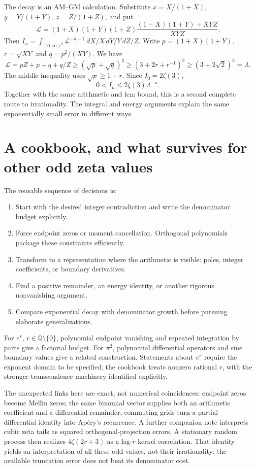 \documentclass[11pt]{article}
\newcommand{\dd}{\,d}
\begin{document}
The decay is an AM--GM calculation. Substitute $x=X/(1+X)$, $y=Y/(1+Y)$, $z=Z/(1+Z)$, and put
\[
 \mathcal L=(1+X)(1+Y)(1+Z)
       \frac{(1+X)(1+Y)+XYZ}{XYZ}.
\]
Then $I_n=\int_{(0,\infty)^3}\mathcal L^{-n-1}\dd X/X\dd Y/Y\dd Z/Z$. Write $p=(1+X)(1+Y)$, $r=\sqrt{XY}$ and $q=p^2/(XY)$. We have
\[
 \mathcal L=pZ+p+q+q/Z\ge(\sqrt p+\sqrt q)^2
 \ge(3+2r+r^{-1})^2\ge(3+2\sqrt2)^2=\Lambda.
\]
The middle inequality uses $\sqrt p\ge1+r$. Since $I_0=2\zeta(3)$,
\[
 0<I_n\le2\zeta(3)\Lambda^{-n}.
\]
Together with the same arithmetic and lcm bound, this is a second complete route to irrationality. The integral and energy arguments explain the same exponentially small error in different ways.

\section{A cookbook, and what survives for other odd zeta values}
The reusable sequence of decisions is:
\begin{enumerate}
 \item Start with the desired integer contradiction and write the denominator budget explicitly.
 \item Force endpoint zeros or moment cancellation. Orthogonal polynomials package these constraints efficiently.
 \item Transform to a representation where the arithmetic is visible: poles, integer coefficients, or boundary derivatives.
 \item Find a positive remainder, an energy identity, or another rigorous nonvanishing argument.
 \item Compare exponential decay with denominator growth before pursuing elaborate generalizations.
\end{enumerate}
For $e^r$, $r\in\mathbb Q\setminus\{0\}$, polynomial endpoint vanishing and repeated integration by parts give a factorial budget. For $\pi^2$, polynomial differential operators and sine boundary values give a related construction. Statements about $\pi^r$ require the exponent domain to be specified; the cookbook treats nonzero rational $r$, with the stronger transcendence machinery identified explicitly.

The unexpected links here are exact, not numerical coincidences: endpoint zeros become Mellin zeros; the same binomial vector supplies both an arithmetic coefficient and a differential remainder; commuting grids turn a partial differential identity into Ap\'ery's recurrence. A further companion note interprets cubic zeta tails as squared orthogonal-projection errors. A stationary random process then realizes $4\zeta(2r+3)$ as a lag-$r$ kernel correlation. That identity yields an interpretation of all these odd values, not their irrationality: the available truncation error does not beat its denominator cost.
\end{document}
